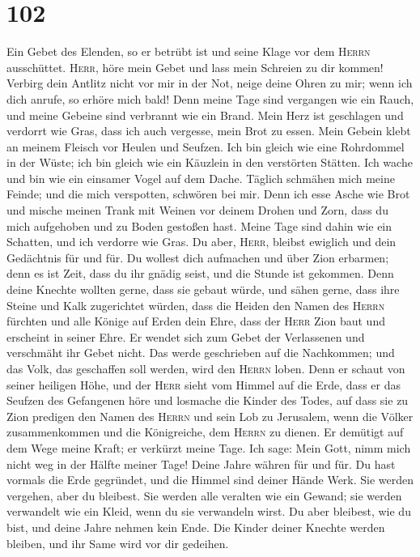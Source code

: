 \hypertarget{section-101}{%
\section{102}\label{section-101}}

 Ein Gebet des Elenden, so er betrübt ist und seine Klage
vor dem \textsc{Herrn} ausschüttet.  \textsc{Herr}, höre
mein Gebet und lass mein Schreien zu dir kommen!  Verbirg
dein Antlitz nicht vor mir in der Not, neige deine Ohren zu mir; wenn
ich dich anrufe, so erhöre mich bald!  Denn meine Tage
sind vergangen wie ein Rauch, und meine Gebeine sind verbrannt wie ein
Brand.  Mein Herz ist geschlagen und verdorrt wie Gras,
dass ich auch vergesse, mein Brot zu essen.  Mein Gebein
klebt an meinem Fleisch vor Heulen und Seufzen.  Ich bin
gleich wie eine Rohrdommel in der Wüste; ich bin gleich wie ein Käuzlein
in den verstörten Stätten.  Ich wache und bin wie ein
einsamer Vogel auf dem Dache.  Täglich schmähen mich meine
Feinde; und die mich verspotten, schwören bei mir.  Denn
ich esse Asche wie Brot und mische meinen Trank mit Weinen
 vor deinem Drohen und Zorn, dass du mich aufgehoben und
zu Boden gestoßen hast.  Meine Tage sind dahin wie ein
Schatten, und ich verdorre wie Gras.  Du aber,
\textsc{Herr}, bleibst ewiglich und dein Gedächtnis für und für.
 Du wollest dich aufmachen und über Zion erbarmen; denn
es ist Zeit, dass du ihr gnädig seist, und die Stunde ist gekommen.
 Denn deine Knechte wollten gerne, dass sie gebaut würde,
und sähen gerne, dass ihre Steine und Kalk zugerichtet würden,
 dass die Heiden den Namen des \textsc{Herrn} fürchten
und alle Könige auf Erden dein Ehre,  dass der
\textsc{Herr} Zion baut und erscheint in seiner Ehre.  Er
wendet sich zum Gebet der Verlassenen und verschmäht ihr Gebet nicht.
 Das werde geschrieben auf die Nachkommen; und das Volk,
das geschaffen soll werden, wird den \textsc{Herrn} loben.
 Denn er schaut von seiner heiligen Höhe, und der
\textsc{Herr} sieht vom Himmel auf die Erde,  dass er das
Seufzen des Gefangenen höre und losmache die Kinder des Todes,
 auf dass sie zu Zion predigen den Namen des
\textsc{Herrn} und sein Lob zu Jerusalem,  wenn die
Völker zusammenkommen und die Königreiche, dem \textsc{Herrn} zu dienen.
 Er demütigt auf dem Wege meine Kraft; er verkürzt meine
Tage.  Ich sage: Mein Gott, nimm mich nicht weg in der
Hälfte meiner Tage! Deine Jahre währen für und für.  Du
hast vormals die Erde gegründet, und die Himmel sind deiner Hände Werk.
 Sie werden vergehen, aber du bleibest. Sie werden alle
veralten wie ein Gewand; sie werden verwandelt wie ein Kleid, wenn du
sie verwandeln wirst.  Du aber bleibest, wie du bist, und
deine Jahre nehmen kein Ende.  Die Kinder deiner Knechte
werden bleiben, und ihr Same wird vor dir gedeihen.

